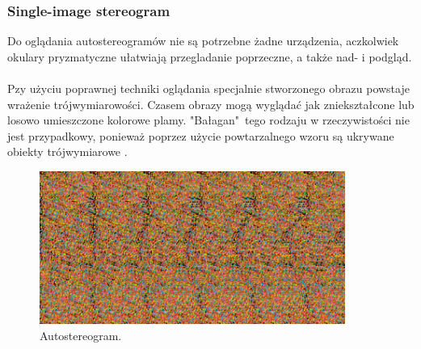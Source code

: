 \subsubsection{Single-image stereogram} 
Do oglądania autostereogramów nie są potrzebne żadne urządzenia, aczkolwiek okulary pryzmatyczne ułatwiają przegladanie poprzeczne, a także nad- i podgląd.\paragraph{} 
Pzy użyciu poprawnej techniki oglądania specjalnie stworzonego obrazu powstaje wrażenie trójwymiarowości. Czasem obrazy mogą wyglądać jak zniekształcone lub losowo umieszczone kolorowe plamy. "Bałagan"\ tego rodzaju w rzeczywistości nie jest przypadkowy, ponieważ poprzez użycie powtarzalnego wzoru są ukrywane obiekty trójwymiarowe \cite{stereoscopythesis}.
\begin{figure}[H]
		\centering
 		\includegraphics[width=10cm]{autostereogram.png}
    	\caption{Autostereogram.}
 		\label{rys2}
\end{figure}

